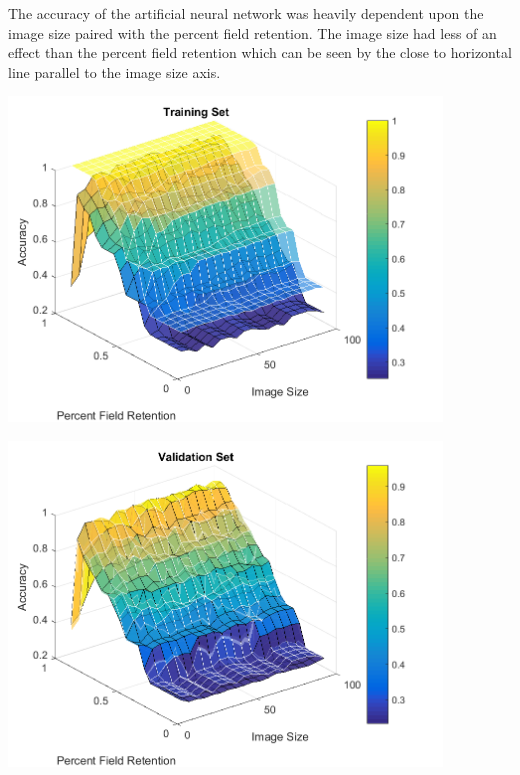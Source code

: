 \documentclass[12pt]{article}
\begin{document}
\begin{enumerate}
  The accuracy of the artificial neural network was heavily dependent upon the image size paired with the percent field retention. The image size had less of an effect than the percent field retention which can be seen by the close to horizontal line parallel to the image size axis.\\
  \begin{center}
    \includegraphics[width=115mm]{./figs/num_fields_empirical_training_testing_overlay.png}
    \label{fig:img_size_train_test}
  \end{center}
  \begin{center}
    \includegraphics[width=115mm]{./figs/num_fields_empirical_validation_testing_overlay.png}
    \label{fig:img_size_valid_test}
  \end{center}


\end{enumerate}
\end{document}
